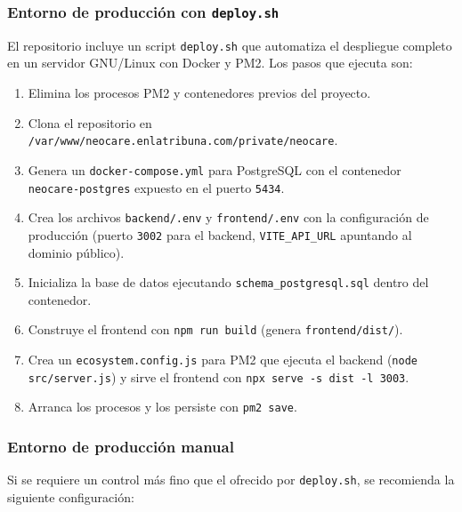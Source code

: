 \documentclass[12pt,letterpaper]{article}
\begin{document}
\subsubsection{Entorno de producción con \texttt{deploy.sh}}

El repositorio incluye un script \texttt{deploy.sh} que automatiza el despliegue completo en un servidor GNU/Linux con Docker y PM2. Los pasos que ejecuta son:

\begin{enumerate}
    \item Elimina los procesos PM2 y contenedores previos del proyecto.
    \item Clona el repositorio en \texttt{/var/www/neocare.enlatribuna.com/private/neocare}.
    \item Genera un \texttt{docker-compose.yml} para PostgreSQL con el contenedor \texttt{neocare-postgres} expuesto en el puerto \texttt{5434}.
    \item Crea los archivos \texttt{backend/.env} y \texttt{frontend/.env} con la configuración de producción (puerto \texttt{3002} para el backend, \texttt{VITE\_API\_URL} apuntando al dominio público).
    \item Inicializa la base de datos ejecutando \texttt{schema\_postgresql.sql} dentro del contenedor.
    \item Construye el frontend con \texttt{npm run build} (genera \texttt{frontend/dist/}).
    \item Crea un \texttt{ecosystem.config.js} para PM2 que ejecuta el backend (\texttt{node src/server.js}) y sirve el frontend con \texttt{npx serve -s dist -l 3003}.
    \item Arranca los procesos y los persiste con \texttt{pm2 save}.
\end{enumerate}

\subsubsection{Entorno de producción manual}

Si se requiere un control más fino que el ofrecido por \texttt{deploy.sh}, se recomienda la siguiente configuración:
\end{document}
